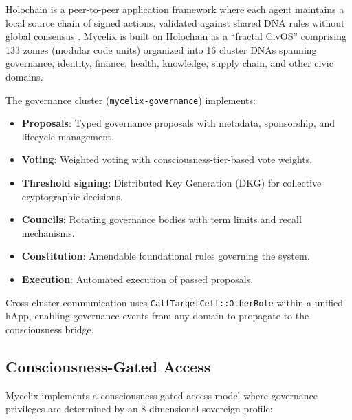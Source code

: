 \documentclass[11pt,a4paper]{article}
\begin{document}
Holochain is a peer-to-peer application framework where each agent maintains a local source chain of signed actions, validated against shared DNA rules without global consensus \citep{harris2018holochain}.
Mycelix is built on Holochain as a ``fractal CivOS'' comprising 133 zomes (modular code units) organized into 16 cluster DNAs spanning governance, identity, finance, health, knowledge, supply chain, and other civic domains.

The governance cluster (\texttt{mycelix-governance}) implements:
\begin{itemize}
  \item \textbf{Proposals}: Typed governance proposals with metadata, sponsorship, and lifecycle management.
  \item \textbf{Voting}: Weighted voting with consciousness-tier-based vote weights.
  \item \textbf{Threshold signing}: Distributed Key Generation (DKG) for collective cryptographic decisions.
  \item \textbf{Councils}: Rotating governance bodies with term limits and recall mechanisms.
  \item \textbf{Constitution}: Amendable foundational rules governing the system.
  \item \textbf{Execution}: Automated execution of passed proposals.
\end{itemize}

Cross-cluster communication uses \texttt{CallTargetCell::OtherRole} within a unified hApp, enabling governance events from any domain to propagate to the consciousness bridge.

\subsection{Consciousness-Gated Access}

Mycelix implements a consciousness-gated access model where governance privileges are determined by an 8-dimensional sovereign profile:
\end{document}
